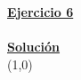\indent\underline{\textbf{Ejercicio 6}}\\
\lipsum[4]\\

\indent\underline{\textbf{Solución}}\\


\line(1,0){\textwidth}
